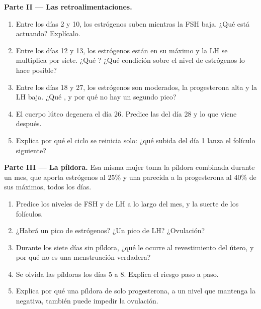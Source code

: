 \begin{problem}
\medskip
\noindent\textbf{Parte II --- Las retroalimentaciones.}
\begin{enumerate}[resume]
  \item Entre los días 2 y 10, los estrógenos suben mientras la FSH
        baja. ¿Qué  está actuando? Explícalo.
  \item Entre los días 12 y 13, los estrógenos están en su máximo y la
        LH se multiplica por siete. ¿Qué ? ¿Qué
        condición sobre el nivel de estrógenos lo hace posible?
  \item Entre los días 18 y 27, los estrógenos son moderados, la
        progesterona alta y la LH baja. ¿Qué , y por
        qué no hay un segundo pico?
  \item El cuerpo lúteo degenera el día 26. Predice las  del
        día 28 y lo que viene después.
  \item Explica por qué el ciclo se reinicia solo: ¿qué subida del día
        1 lanza el folículo siguiente?
\end{enumerate}

\medskip
\noindent\textbf{Parte III --- La píldora.}
Esa misma mujer toma la píldora combinada durante un mes, que aporta
estrógenos al 25\% y una  parecida a la progesterona al 40\% de
sus máximos, todos los días.
\begin{enumerate}[resume]
  \item Predice los niveles de FSH y de LH a lo largo del mes, y la
        suerte de los folículos.
  \item ¿Habrá un pico de estrógenos? ¿Un pico de LH? ¿Ovulación?
  \item Durante los siete días sin píldora, ¿qué le ocurre al
        revestimiento del útero, y por qué no es una menstruación
        verdadera?
  \item Se olvida las píldoras los días 5 a 8. Explica el riesgo paso a
        paso.
  \item Explica por qué una píldora de solo progesterona, a un nivel
        que mantenga la  negativa, también puede
        impedir la ovulación.
\end{enumerate}


\end{problem}
